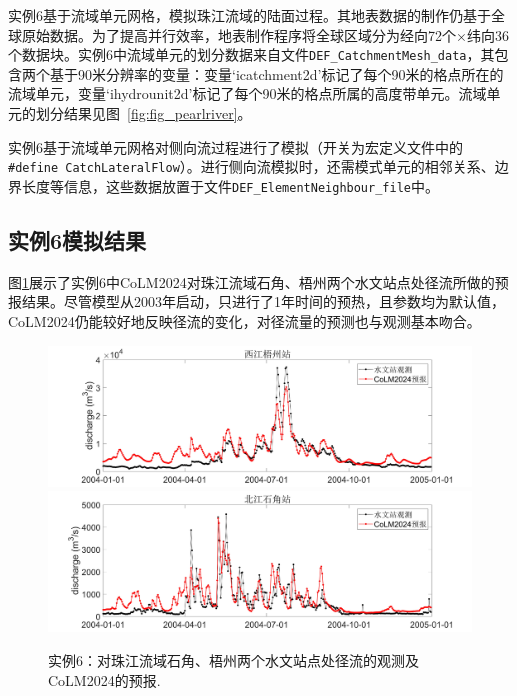 实例6基于流域单元网格，模拟珠江流域的陆面过程。其地表数据的制作仍基于全球原始数据。为了提高并行效率，地表制作程序将全球区域分为经向72个×纬向36个数据块。实例6中流域单元的划分数据来自文件\texttt{DEF\_CatchmentMesh\_data}，其包含两个基于90米分辨率的变量：变量`icatchment2d'标记了每个90米的格点所在的流域单元，变量`ihydrounit2d'标记了每个90米的格点所属的高度带单元。流域单元的划分结果见图~\ref{fig:fig_pearlriver}。

实例6基于流域单元网格对侧向流过程进行了模拟（开关为宏定义文件中的\texttt{\#define CatchLateralFlow}）。进行侧向流模拟时，还需模式单元的相邻关系、边界长度等信息，这些数据放置于文件\texttt{DEF\_ElementNeighbour\_file}中。

\subsection{实例6模拟结果}

图\ref{fig:fig_pearlriver_discharge}展示了实例6中CoLM2024对珠江流域石角、梧州两个水文站点处径流所做的预报结果。尽管模型从2003年启动，只进行了1年时间的预热，且参数均为默认值，CoLM2024仍能较好地反映径流的变化，对径流量的预测也与观测基本吻合。

\begin{figure}[htpb]
    \centering
    \includegraphics[width=\textwidth]{figures/Example06_pearl_wuzhou_discharge.jpg}
    \includegraphics[width=\textwidth]{figures/Example06_pearl_shijiao_discharge.jpg}
    \caption{实例6：对珠江流域石角、梧州两个水文站点处径流的观测及CoLM2024的预报.}
    \label{fig:fig_pearlriver_discharge}
\end{figure}

